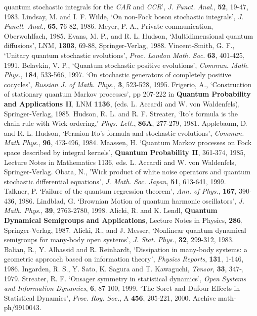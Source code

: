 \begin{thebibliography}{99}
quantum stochastic integrals for the {\em CAR} and {\em CCR}',
{\em J. Funct. Anal.}, {\bf 52}, 19-47, 1983.
 Lindsay, M. and I. F. Wilde, `On non-Fock boson
stochastic integrals', {\em J. Functl. Anal.}, {\bf 65}, 76-82, 1986.
 Meyer, P.-A., Private communication, Oberwohlfach, 1985.
 Evans, M. P., and R. L. Hudson, `Multidimensional quantum
diffusions', LNM, {\bf 1303}, 69-88, Springer-Verlag, 1988.
 Vincent-Smith, G. F., `Unitary quantum stochastic evolutions',
{\em Proc. London Math. Soc.} {\bf 63}, 401-425, 1991.
 Belavkin, V. P., `Quantum stochastic positive
evolutions', {\em Commun. Math. Phys.}, {\bf 184}, 533-566, 1997. `On stochastic
generators of completely positive cocycles', {\em Russian J. of Math.
Phys.}, {\bf 3}, 523-528, 1995.
 Frigerio, A., `Construction of stationary quantum Markov
processes', pp 207-222 in {\bf Quantum Probability and Applications II},  
LNM {\bf 1136}, (eds. L. Accardi and W. von Waldenfels), Springer-Verlag,
1985.
 Hudson, R. L. and R. F. Streater, `Ito's formula is
the chain rule with Wick ordering,' {\em Phys. Lett.}, {\bf 86A}, 277-279,
1981.
 Applebaum, D. and R. L. Hudson, `Fermion Ito's formula
and stochastic evolutions', {\em Commun. Math Phys.}, {\bf 96},
473-496, 1984.
 Maassen, H. `Quantum Markov processes on Fock space
described by integral kernels', {\bf Quantum Probability II}, 361-374, 1985,
Lecture Notes in Mathematics 1136, eds. L. Accardi and W. von Waldenfels,
Springer-Verlag.
 Obata, N., 'Wick product of white noise operators and
quantum stochastic differential equations', {\em J. Math. Soc. Japan},
{\bf 51}, 613-641, 1999.
 Talkner, P. `Failure of the quantum regression
theorem', {\em Ann. of Phys.}, {\bf 167}, 390-436, 1986.
 Lindblad, G. `Brownian Motion of quantum harmonic
oscillators', {\em J. Math. Phys.}, {\bf 39}, 2763-2780, 1998.
 Alicki, R. and K. Lendl, {\bf Quantum Dynamical Semigroups
and Applications}, Lecture Notes in Physics, {\bf 286}, Springer-Verlag,
1987.
 Alicki, R., and J. Messer, `Nonlinear quantum dynamical 
semigroups for many-body open systems', {\em J. Stat. Phys.}, {\bf 32},
299-312, 1983.
 Balian, R., Y. Alhassid and R. Reinhardt,
`Dissipation in many-body systems: a geometric approach based on
information theory', {\em Physics Reports}, {\bf 131}, 1-146, 1986.
 Ingarden, R. S., Y. Sato, K. Sagura and T. Kawaguchi,
{\em Tensor}, {\bf 33}, 347-, 1979.
 Streater, R. F. `Onsager symmetry in statistical dynamics',
{\em Open Systems and Information Dynamics}, {\bf 6}, 87-100, 1999.
`The Soret and Dufour Effects in Statistical Dynamics', {\em Proc. Roy.
Soc.}, A {\bf 456}, 205-221, 2000. Archive math-ph/9910043.

\end{thebibliography}



